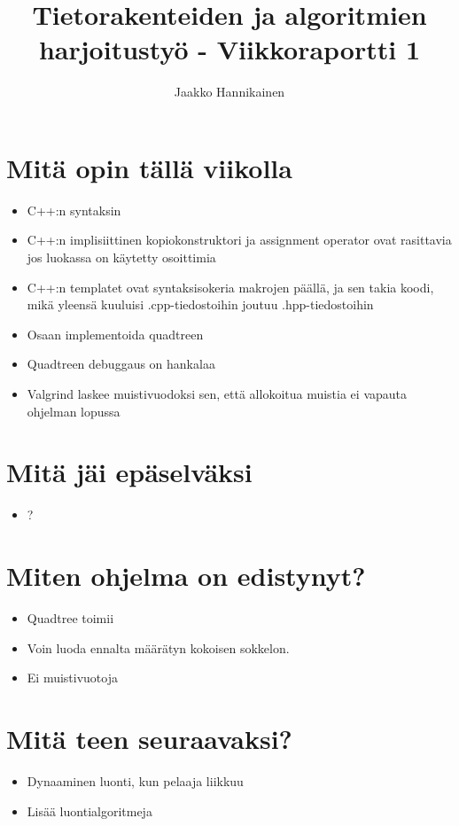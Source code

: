 \documentclass{article}
\author{Jaakko Hannikainen}
\title{Tietorakenteiden ja algoritmien harjoitustyö - Viikkoraportti 1}
\begin{document}
\maketitle

\section{Mitä opin tällä viikolla}
\begin{itemize}
    \item C++:n syntaksin
    \item C++:n implisiittinen kopiokonstruktori ja assignment operator ovat
        rasittavia jos luokassa on käytetty osoittimia
    \item C++:n templatet ovat syntaksisokeria makrojen päällä, ja sen takia
        koodi, mikä yleensä kuuluisi .cpp-tiedostoihin joutuu .hpp-tiedostoihin
    \item Osaan implementoida quadtreen
    \item Quadtreen debuggaus on hankalaa
    \item Valgrind laskee muistivuodoksi sen, että allokoitua muistia ei vapauta
        ohjelman lopussa
\end{itemize}

\section{Mitä jäi epäselväksi}
\begin{itemize}
    \item ?
\end{itemize}

\section{Miten ohjelma on edistynyt?}
\begin{itemize}
    \item Quadtree toimii
    \item Voin luoda ennalta määrätyn kokoisen sokkelon.
    \item Ei muistivuotoja
\end{itemize}

\section{Mitä teen seuraavaksi?}
\begin{itemize}
    \item Dynaaminen luonti, kun pelaaja liikkuu
    \item Lisää luontialgoritmeja
\end{itemize}
\end{document}
